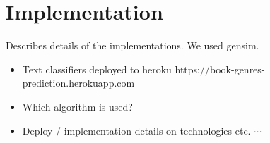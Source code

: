 \chapter{Implementation}
Describes details of the implementations. We used gensim\cite{gensim}.
\begin{itemize}
  \item Text classifiers deployed to heroku 
  \subitem https://book-genres-prediction.herokuapp.com
  \item Which algorithm is used?
  \item Deploy / implementation details on technologies etc. $\cdots$
\end{itemize}
